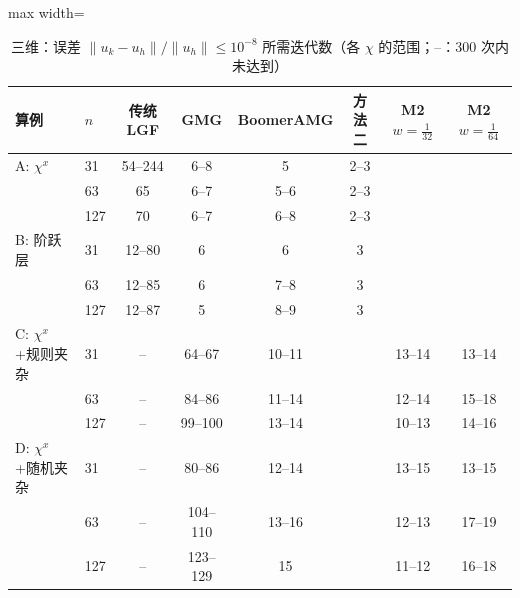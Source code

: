 \begin{table}[H]\centering\small
\caption{三维：误差 $\|u_k-u_h\|/\|u_h\|\le10^{-8}$ 所需迭代数（各 $\chi$ 的范围；--：300 次内未达到）}\label{tab:k83d}
\begin{adjustbox}{max width=\textwidth}
\begin{tabular}{llcccccc}
\toprule
算例 & $n$ & 传统 LGF & GMG & BoomerAMG & 方法二 & M2 $w{=}\frac1{32}$ & M2 $w{=}\frac1{64}$ \\
\midrule
A: $\chi^x$ & 31 & 54--244 & 6--8 & 5 & 2--3 &  &  \\
 & 63 & 65 & 6--7 & 5--6 & 2--3 &  &  \\
 & 127 & 70 & 6--7 & 6--8 & 2--3 &  &  \\
\midrule
B: 阶跃层 & 31 & 12--80 & 6 & 6 & 3 &  &  \\
 & 63 & 12--85 & 6 & 7--8 & 3 &  &  \\
 & 127 & 12--87 & 5 & 8--9 & 3 &  &  \\
\midrule
C: $\chi^x$+规则夹杂 & 31 & -- & 64--67 & 10--11 &  & 13--14 & 13--14 \\
 & 63 & -- & 84--86 & 11--14 &  & 12--14 & 15--18 \\
 & 127 & -- & 99--100 & 13--14 &  & 10--13 & 14--16 \\
\midrule
D: $\chi^x$+随机夹杂 & 31 & -- & 80--86 & 12--14 &  & 13--15 & 13--15 \\
 & 63 & -- & 104--110 & 13--16 &  & 12--13 & 17--19 \\
 & 127 & -- & 123--129 & 15 &  & 11--12 & 16--18 \\
\bottomrule
\end{tabular}
\end{adjustbox}
\end{table}

